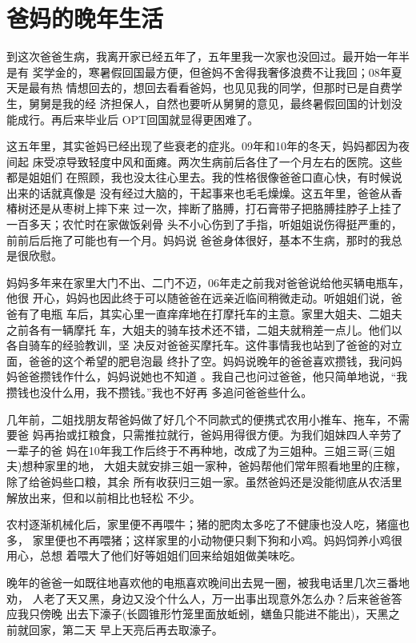 \documentclass[12pt]{book}
\begin{document}
\section{爸妈的晚年生活}
\label{sec-9-8}

到这次爸爸生病，我离开家已经五年了，五年里我一次家也没回过。最开始一年半是有
奖学金的，寒暑假回国最方便，但爸妈不舍得我奢侈浪费不让我回；08年夏天是最有热
情想回去的，想回去看看爸妈，也见见我的同学，但那时已是自费学生，舅舅是我的经
济担保人，自然也要听从舅舅的意见，最终暑假回国的计划没能成行。再后来毕业后
OPT回国就显得更困难了。

这五年里，其实爸妈已经出现了些衰老的症兆。09年和10年的冬天，妈妈都因为夜间起
床受凉导致轻度中风和面瘫。两次生病前后各住了一个月左右的医院。这些都是姐姐们
在照顾，我也没太往心里去。我的性格很像爸爸口直心快，有时候说出来的话就真像是
没有经过大脑的，干起事来也毛毛燥燥。这五年里，爸爸从香椿树还是从枣树上摔下来
过一次，摔断了胳膊，打石膏带子把胳膊挂脖子上挂了一百多天；农忙时在家做饭剁骨
头不小心伤到了手指，听姐姐说伤得挺严重的，前前后后拖了可能也有一个月。妈妈说
爸爸身体很好，基本不生病，那时的我总是很欣慰。

妈妈多年来在家里大门不出、二门不迈，06年走之前我对爸爸说给他买辆电瓶车，他很
开心，妈妈也因此终于可以随爸爸在远亲近临间稍微走动。听姐姐们说，爸爸有了电瓶
车后，其实心里一直痒痒地在打摩托车的主意。家里大姐夫、二姐夫之前各有一辆摩托
车，大姐夫的骑车技术还不错，二姐夫就稍差一点儿。他们以各自骑车的经验教训，坚
决反对爸爸买摩托车。这件事情我也站到了爸爸的对立面，爸爸的这个希望的肥皂泡最
终扑了空。妈妈说晚年的爸爸喜欢攒钱，我问妈妈爸爸攒钱作什么，妈妈说她也不知道
。我自己也问过爸爸，他只简单地说，“我攒钱也没什么用，我不攒钱。”我也不好再
多追问爸爸些什么。

几年前，二姐找朋友帮爸妈做了好几个不同款式的便携式农用小推车、拖车，不需要爸
妈再抬或扛粮食，只需推拉就行，爸妈用得很方便。为我们姐妹四人辛劳了一辈子的爸
妈在10年我工作后终于不再种地，改成了为三姐种。三姐三哥(三姐夫)想种家里的地，
大姐夫就安排三姐一家种，爸妈帮他们常年照看地里的庄稼，除了给爸妈些口粮，其余
所有收获归三姐一家。虽然爸妈还是没能彻底从农活里解放出来，但和以前相比也轻松
不少。

农村逐渐机械化后，家里便不再喂牛；猪的肥肉太多吃了不健康也没人吃，猪瘟也多，
家里便也不再喂猪；这样家里的小动物便只剩下狗和小鸡。妈妈饲养小鸡很用心，总想
着喂大了他们好等姐姐们回来给姐姐做美味吃。

晚年的爸爸一如既往地喜欢他的电瓶喜欢晚间出去晃一圈，被我电话里几次三番地劝，
人老了天又黑，身边又没个什么人，万一出事出现意外怎么办？后来爸爸答应我只傍晚
出去下濠子(长圆锥形竹笼里面放蚯蚓，蟮鱼只能进不能出)，天黑之前就回家，第二天
早上天亮后再去取濠子。
\end{document}
